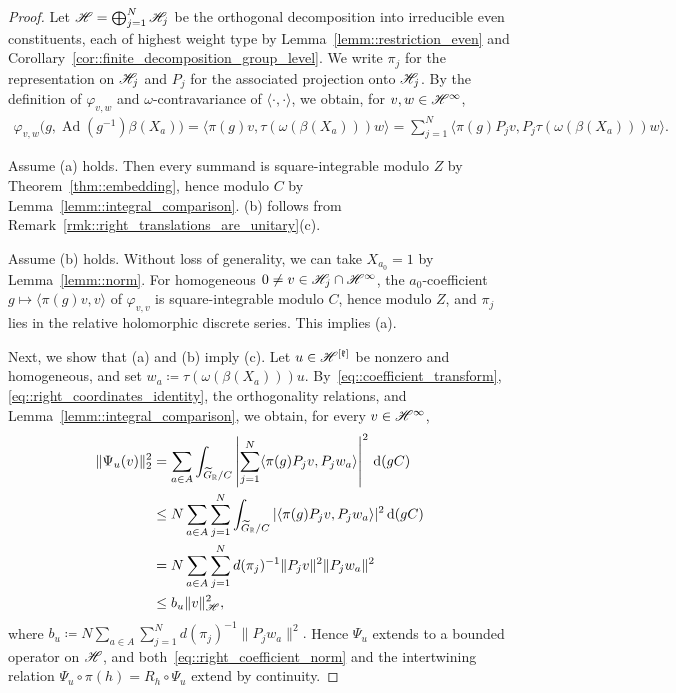 \begin{proof}

Let ${\mathscr{H}}=\bigoplus_{j=1}^{N}{\mathscr{H}}_j$ be the orthogonal decomposition into irreducible even constituents, each of highest weight type by Lemma~\ref{lemm::restriction_even} and Corollary~\ref{cor::finite_decomposition_group_level}. We write $\pi_j$ for the representation on ${\mathscr{H}}_j$ and $P_j$ for the associated projection onto ${\mathscr{H}}_j$. 
By the definition of $\varphi_{v,w}$ and $\omega$-contravariance of $\langle\cdot,\cdot\rangle$, we obtain, for $v,w\in{\mathscr{H}}^\infty$,
\begin{equation}\label{eq::right_coordinates_identity}
\begin{aligned}
\varphi_{v,w}\bigl(g,\operatorname{Ad}(g^{-1})\beta(X_a)\bigr)
=
\langle\pi(g)v,\tau(\omega(\beta(X_a)))w\rangle=
\sum_{j=1}^{N}\langle\pi(g)P_jv,P_j\tau(\omega(\beta(X_a)))w\rangle.
\end{aligned}
\end{equation}

Assume (a) holds. Then every summand is square-integrable modulo $Z$ by Theorem~\ref{thm::embedding}, hence modulo $C$ by Lemma~\ref{lemm::integral_comparison}. (b) follows from Remark~\ref{rmk::right_translations_are_unitary}(c). 

Assume (b) holds. Without loss of generality, we can take $X_{a_0}=1$ by Lemma~\ref{lemm::norm}. For homogeneous $0\neq v\in{\mathscr{H}}_j\cap{\mathscr{H}}^\infty$, the $a_0$-coefficient $g\mapsto\langle\pi(g)v,v\rangle$ of $\varphi_{v,v}$ is square-integrable modulo $C$, hence modulo $Z$, and $\pi_j$ lies in the relative holomorphic discrete series. This implies (a).

Next, we show that (a) and (b) imply (c). Let $u\in{\mathscr{H}}^{[{\mathfrak k}]}$ be nonzero and homogeneous, and set $w_a\coloneqq\tau(\omega(\beta(X_{a})))u$. 
By~\eqref{eq::coefficient_transform}, \eqref{eq::right_coordinates_identity}, the orthogonality relations, and Lemma~\ref{lemm::integral_comparison}, we obtain, for every $v\in{\mathscr{H}}^\infty$,
\begin{equation}
\label{eq::right_coefficient_norm}
\begin{aligned}
\|\Psi_u(v)\|_2^2
&=\sum_{a\in A}\int_{\widetilde{G}_{{\mathbb R}}/C}
\left|\sum_{j=1}^N\langle\pi(g)P_jv,P_jw_a\rangle\right|^2\,\mathrm{d}(gC)\\
&\leq N\sum_{a\in A}\sum_{j=1}^N
\int_{\widetilde{G}_{{\mathbb R}}/C}
|\langle\pi(g)P_jv,P_jw_a\rangle|^2\,\mathrm{d}(gC)\\
&=N\sum_{a\in A}\sum_{j=1}^N
d(\pi_j)^{-1}\|P_jv\|^2\|P_jw_a\|^2\\
&\leq b_u\|v\|_{{\mathscr{H}}}^2,
\end{aligned}
\end{equation}
where
$
b_u\coloneqq N\sum_{a\in A}\sum_{j=1}^N d(\pi_j)^{-1}\|P_jw_a\|^2.
$
Hence $\Psi_u$ extends to a bounded operator on ${\mathscr{H}}$, and both~\eqref{eq::right_coefficient_norm} and the intertwining relation $\Psi_u\circ\pi(h)=R_h\circ\Psi_u$ extend by continuity.


\end{proof}
